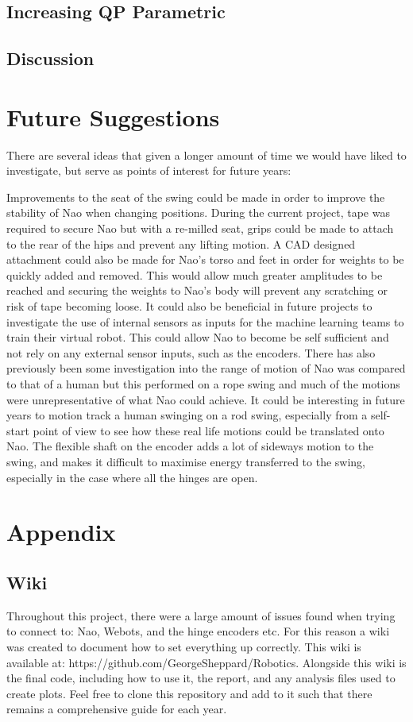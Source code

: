 \documentclass[11pt]{article}
\newcommand*\ruleline[1]{\par\noindent\raisebox{.8ex}{\makebox[\linewidth]{\hrulefill\hspace{1ex}\raisebox{-.8ex}{#1}\hspace{1ex}\hrulefill}}}
\begin{document}
\subsection{Increasing QP Parametric}

\subsection{Discussion}

\section{Future Suggestions}
\ruleline{David Thomas}
There are several ideas that given a longer amount of time we would have liked to investigate, but serve as points of interest for future years:

Improvements to the seat of the swing could be made in order to improve the stability of Nao when changing positions. During the current project, tape was required to secure Nao but with a re-milled seat, grips could be made to attach to the rear of the hips and prevent any lifting motion. A CAD designed attachment could also be made for Nao's torso and feet in order for weights to be quickly added and removed. This would allow much greater amplitudes to be reached and securing the weights to Nao's body will prevent any scratching or risk of tape becoming loose. It could also be beneficial in future projects to investigate the use of internal sensors as inputs for the machine learning teams to train their virtual robot. This could allow Nao to become be self sufficient and not rely on any external sensor inputs, such as the encoders. There has also previously been some investigation into the range of motion of Nao was compared to that of a human but this performed on a rope swing and much of the motions were unrepresentative of what Nao could achieve. It could be interesting in future years to motion track a human swinging on a rod swing, especially from a self-start point of view to see how these real life motions could be translated onto Nao. The flexible shaft on the encoder adds a lot of sideways motion to the swing, and makes it difficult to maximise energy transferred to the swing, especially in the case where all the hinges are open. 
\appendix
\section{Appendix}
\subsection{Wiki} \label{sec:wiki}
\ruleline{George Sheppard}
Throughout this project, there were a large amount of issues found when trying to connect to: Nao, Webots, and the hinge encoders etc. For this reason a wiki was created to document how to set everything up correctly. This wiki is available at: https://github.com/GeorgeSheppard/Robotics. Alongside this wiki is the final code, including how to use it, the report, and any analysis files used to create plots. Feel free to clone this repository and add to it such that there remains a comprehensive guide for each year.
\end{document}
